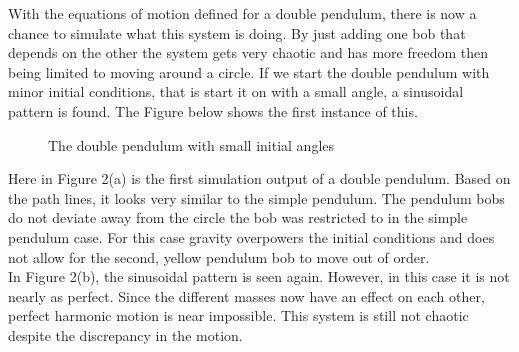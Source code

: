 \documentclass[runningheads]{llncs}
\begin{document}
With the equations of motion defined for a double pendulum, there is now a chance to simulate what this system is doing. By just adding one bob that depends on the other the system gets very chaotic and has more freedom then being limited to moving around a circle. If we start the double pendulum with minor initial conditions, that is start it on with a small angle, a sinusoidal pattern is found. The Figure below shows the first instance of this.

\begin{figure}%
    \centering
    \qquad
    \caption{The double pendulum with small initial angles}%
    \label{fig:example}%
\end{figure}

Here in Figure 2(a) is the first simulation output of a double pendulum. Based on the path lines, it looks very similar to the simple pendulum. The pendulum bobs do not deviate away from the circle the bob was restricted to in the simple pendulum case. For this case gravity overpowers the initial conditions and does not allow for the second, yellow pendulum bob to move out of order. \\

In Figure 2(b), the sinusoidal pattern is seen again. However, in this case it is not nearly as perfect. Since the different masses now have an effect on each other, perfect harmonic motion is near impossible. This system is still not chaotic despite the discrepancy in the motion.
\end{document}
